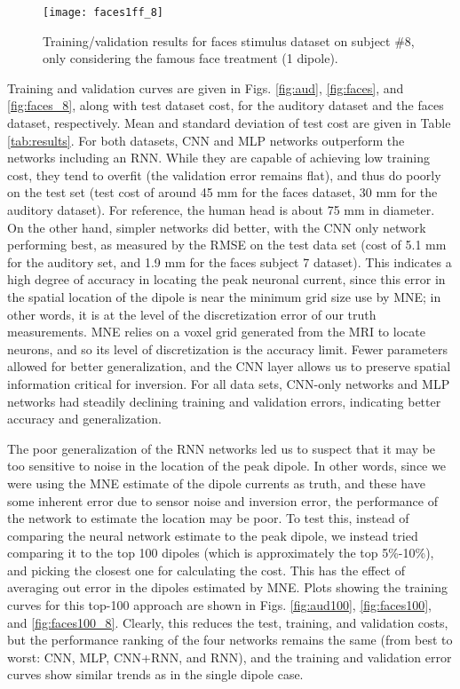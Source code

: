 \documentclass[journal]{IEEEtran}
\begin{document}
\begin{figure}[!h]
\centering
\texttt{[image: faces1ff\_8]}
\caption{Training/validation results for faces stimulus dataset on subject \#8, only considering the famous face treatment (1 dipole).}
\label{fig:faces1ff_8}
\end{figure}


Training and validation curves are given in Figs. \ref{fig:aud}, \ref{fig:faces}, and \ref{fig:faces_8}, along with test dataset cost, for the auditory dataset and the faces dataset, respectively. Mean and standard deviation of test cost are given in Table \ref{tab:results}. For both datasets, CNN and MLP networks outperform the networks including an RNN. While they are capable of achieving low training cost, they tend to overfit (the validation error remains flat), and thus do poorly on the test set (test cost of around 45 mm for the faces dataset, 30 mm for the auditory dataset). For reference, the human head is about 75 mm in diameter. On the other hand, simpler networks did better, with the CNN only network performing best, as measured by the RMSE on the test data set (cost of 5.1 mm for the auditory set, and 1.9 mm for the faces subject 7 dataset). This indicates a high degree of accuracy in locating the peak neuronal current, since this error in the spatial location of the dipole is near the minimum grid size use by MNE; in other words, it is at the level of the discretization error of our truth measurements. MNE relies on a voxel grid generated from the MRI to locate neurons, and so its level of discretization is the accuracy limit. Fewer parameters allowed for better generalization, and the CNN layer allows us to preserve spatial information critical for inversion. For all data sets, CNN-only networks and MLP networks had steadily declining training and validation errors, indicating better accuracy and generalization.

The poor generalization of the RNN networks led us to suspect that it may be too sensitive to noise in the location of the peak dipole. In other words, since we were using the MNE estimate of the dipole currents as truth, and these have some inherent error due to sensor noise and inversion error, the performance of the network to estimate the location may be poor. To test this, instead of comparing the neural network estimate to the peak dipole, we instead tried comparing it to the top 100 dipoles (which is approximately the top 5\%-10\%), and picking the closest one for calculating the cost. This has the effect of averaging out error in the dipoles estimated by MNE. Plots showing the training curves for this top-100 approach are shown in Figs. \ref{fig:aud100}, \ref{fig:faces100}, and \ref{fig:faces100_8}. Clearly, this reduces the test, training, and validation costs, but the performance ranking of the four networks remains the same (from best to worst: CNN, MLP, CNN+RNN, and RNN), and the training and validation error curves show similar trends as in the single dipole case.
\end{document}
